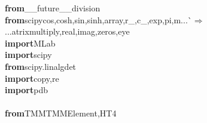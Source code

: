 {{\def\dash{\raise2.1pt\hbox{\rule{4pt}{0.3pt}}\hspace{1pt}}\begin{tabbing}
{\textbf{from}}\hspace{5pt}\_\_future\_\_\hspace{5pt}division
\\
{\textbf{from}}\hspace{5pt}scipy\hspace{5pt}cos,\hspace{5pt}cosh,\hspace{5pt}sin,\hspace{5pt}sinh,\hspace{5pt}array,\hspace{5pt}r\_,\hspace{5pt}c\_,\hspace{5pt}exp,\hspace{5pt}pi,\hspace{5pt}m{}...\`$\Rightarrow$\\
...{}atrixmultiply,\hspace{5pt}real,\hspace{5pt}imag,\hspace{5pt}zeros,\hspace{5pt}eye
\\
{\textbf{import}}\hspace{5pt}MLab
\\
{\textbf{import}}\hspace{5pt}scipy
\\
{\textbf{from}}\hspace{5pt}scipy.linalg\hspace{5pt}det
\\
{\textbf{import}}\hspace{5pt}copy,\hspace{5pt}re
\\
{\textbf{import}}\hspace{5pt}pdb
\\

\\
{\textbf{from}}\hspace{5pt}TMM\hspace{5pt}TMMElement,\hspace{5pt}HT4
\\


\end{tabbing}}}

